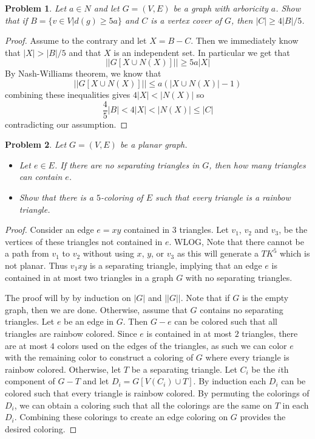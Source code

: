 \documentclass[12pt]{article}
\newtheorem{problem}{Problem}
\begin{document}
\begin{problem} Let $a \in N$ and let $G=(V, E)$ be a graph with
  arboricity $a$. Show that if $B = \{ v \in V | d(g) \geq 5a\}$ and
  $C$ is a vertex cover of $G$, then $|C| \geq 4|B|/5$.
\end{problem}
\begin{proof} Assume to the contrary and let $X = B - C$. Then we
  immediately know that $|X| > |B|/5$ and that $X$ is an independent
  set. In particular we get that
  \[
    ||G[X \cup N(X)]|| \geq 5a |X|
  \]
  By Nash-Williams theorem, we know that
  \[
    ||G[X \cup N(X)]|| \leq a (|X \cup N(X)| - 1)
  \]
  combining these inequalities gives $4|X| < |N(X)|$ so
  \[
    \frac{4}{5} |B| < 4 |X| < |N(X)| \leq |C|
  \]
  contradicting our assumption.
\end{proof}

\begin{problem} Let $G = (V, E)$ be a planar graph.
  \begin{itemize}
  \item[(a)] Let $e \in E$. If there are no separating triangles in
    $G$, then how many triangles can contain $e$.
  \item[(b)] Show that there is a $5$-coloring of $E$ such that every
    triangle is a rainbow triangle.
  \end{itemize}
\end{problem}
\begin{proof}
\item[(a)] Consider an edge $e=xy$ contained in $3$ triangles. Let
  $v_1$, $v_2$ and $v_3$, be the vertices of these triangles not
  contained in $e$. WLOG, Note that there cannot be a path from $v_1$
  to $v_2$ without using $x$, $y$, or $v_3$ as this will generate a
  $TK^5$ which is not planar. Thus $v_1 xy$ is a separating triangle,
  implying that an edge $e$ is contained in at most two triangles in a
  graph $G$ with no separating triangles.
\item[(b)] The proof will by by induction on $|G|$ and $||G||$. Note
  that if $G$ is the empty graph, then we are done. Otherwise, assume
  that $G$ contains no separating triangles. Let $e$ be an edge in
  $G$. Then $G-e$ can be colored such that all triangles are rainbow
  colored. Since $e$ is contained in at most $2$ triangles, there are
  at most $4$ colors used on the edges of the triangles, as such we
  can color $e$ with the remaining color to construct a coloring of
  $G$ where every triangle is rainbow colored. Otherwise, let $T$ be a
  separating triangle. Let $C_i$ be the $i$th component of $G-T$ and
  let $D_i = G[V(C_i) \cup T]$. By induction each $D_i$ can be colored
  such that every triangle is rainbow colored. By permuting the
  colorings of $D_i$, we can obtain a coloring such that all the
  colorings are the same on $T$ in each $D_i$. Combining these
  colorings to create an edge coloring on $G$ provides the desired
  coloring.
\end{proof}
\end{document}
